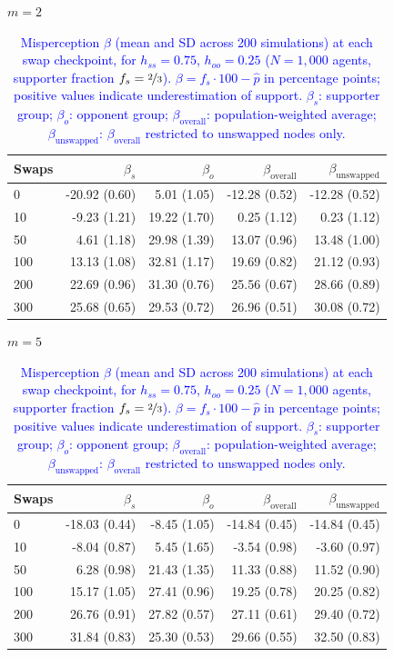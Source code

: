 \begin{table}[H]
\centering
\caption{\textcolor{blue}{Misperception $\beta$ (mean and SD across 200 simulations) at each swap checkpoint, for $h_{ss} = 0.75$, $h_{oo} = 0.25$ ($N = 1{,}000$ agents, supporter fraction $f_s = \nicefrac{2}{3}$). $\beta = f_s \cdot 100 - \hat{p}$ in percentage points; positive values indicate underestimation of support. $\beta_s$: supporter group; $\beta_o$: opponent group; $\beta_{\mathrm{overall}}$: population-weighted average; $\beta_{\mathrm{unswapped}}$: $\beta_{\mathrm{overall}}$ restricted to unswapped nodes only.}}
\label{tab:subset_fs0667_hss750_hoo250}
\par\medskip
\noindent\textit{$m = 2$}\\[2pt]
\begin{tabular}{l rrrr}
\toprule
Swaps & $\beta_s$ & $\beta_o$ & $\beta_{\mathrm{overall}}$ & $\beta_{\mathrm{unswapped}}$ \\
\midrule
0 & -20.92 (0.60) & 5.01 (1.05) & -12.28 (0.52) & -12.28 (0.52) \\
10 & -9.23 (1.21) & 19.22 (1.70) & 0.25 (1.12) & 0.23 (1.12) \\
50 & 4.61 (1.18) & 29.98 (1.39) & 13.07 (0.96) & 13.48 (1.00) \\
100 & 13.13 (1.08) & 32.81 (1.17) & 19.69 (0.82) & 21.12 (0.93) \\
200 & 22.69 (0.96) & 31.30 (0.76) & 25.56 (0.67) & 28.66 (0.89) \\
300 & 25.68 (0.65) & 29.53 (0.72) & 26.96 (0.51) & 30.08 (0.72) \\
\bottomrule
\end{tabular}
\par\medskip
\noindent\textit{$m = 5$}\\[2pt]
\begin{tabular}{l rrrr}
\toprule
Swaps & $\beta_s$ & $\beta_o$ & $\beta_{\mathrm{overall}}$ & $\beta_{\mathrm{unswapped}}$ \\
\midrule
0 & -18.03 (0.44) & -8.45 (1.05) & -14.84 (0.45) & -14.84 (0.45) \\
10 & -8.04 (0.87) & 5.45 (1.65) & -3.54 (0.98) & -3.60 (0.97) \\
50 & 6.28 (0.98) & 21.43 (1.35) & 11.33 (0.88) & 11.52 (0.90) \\
100 & 15.17 (1.05) & 27.41 (0.96) & 19.25 (0.78) & 20.25 (0.82) \\
200 & 26.76 (0.91) & 27.82 (0.57) & 27.11 (0.61) & 29.40 (0.72) \\
300 & 31.84 (0.83) & 25.30 (0.53) & 29.66 (0.55) & 32.50 (0.83) \\

\end{tabular}
\end{table}
